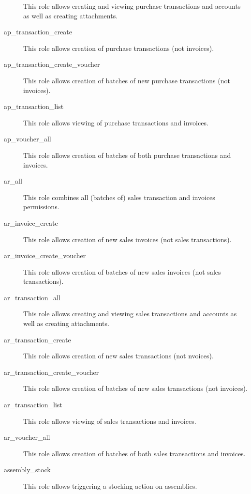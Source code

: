 \begin{description}
                         This role allows creating and viewing purchase transactions and accounts as well as creating attachments.
\item [ap\_transaction\_create] \htmlspacing 
                         This role allows creation of purchase transactions (not invoices).
\item [ap\_transaction\_create\_voucher] \htmlspacing 
                         This role allows creation of batches of new purchase transactions (not invoices).
\item [ap\_transaction\_list] \htmlspacing 
                         This role allows viewing of purchase transactions and invoices.
\item [ap\_voucher\_all] \htmlspacing 
                         This role allows creation of batches of both purchase transactions and invoices.
\item [ar\_all] \htmlspacing 
                         This role combines all (batches of) sales transaction and invoices permissions.
\item [ar\_invoice\_create] \htmlspacing 
                         This role allows creation of new sales invoices (not sales transactions).
\item [ar\_invoice\_create\_voucher] \htmlspacing 
                         This role allows creation of batches of new sales invoices (not sales transactions).
\item [ar\_transaction\_all] \htmlspacing 
                         This role allows creating and viewing sales transactions and accounts as well as creating attachments.
\item [ar\_transaction\_create] \htmlspacing 
                         This role allows creation of new sales transactions (not nvoices).
\item [ar\_transaction\_create\_voucher] \htmlspacing 
                         This role allows creation of batches of new sales transactions (not invoices).
\item [ar\_transaction\_list] \htmlspacing 
                         This role allows viewing of sales transactions and invoices.
\item [ar\_voucher\_all] \htmlspacing 
                         This role allows creation of batches of both sales transactions and invoices.
\item [assembly\_stock] \htmlspacing 
                         This role allows triggering a stocking action on assemblies.


\end{description}
